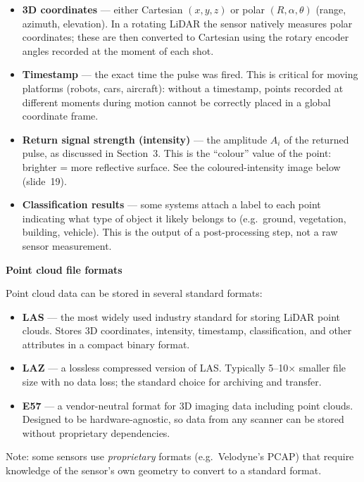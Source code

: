 \documentclass[12pt, a4paper]{article}
\begin{document}
\begin{itemize}[leftmargin=1.4em,itemsep=3pt]
  \item \textbf{3D coordinates} --- either Cartesian $(x, y, z)$ or polar
    $(R, \alpha, \theta)$ (range, azimuth, elevation).
    In a rotating LiDAR the sensor natively measures polar coordinates;
    these are then converted to Cartesian using the rotary encoder angles
    recorded at the moment of each shot.

  \item \textbf{Timestamp} --- the exact time the pulse was fired.
    This is critical for moving platforms (robots, cars, aircraft): without
    a timestamp, points recorded at different moments during motion cannot
    be correctly placed in a global coordinate frame.

  \item \textbf{Return signal strength (intensity)} --- the amplitude $A_i$
    of the returned pulse, as discussed in Section~3.
    This is the ``colour'' value of the point: brighter = more reflective
    surface.
    See the coloured-intensity image below (slide~19).

  \item \textbf{Classification results} --- some systems attach a label to
    each point indicating what type of object it likely belongs to
    (e.g.\ ground, vegetation, building, vehicle).
    This is the output of a post-processing step, not a raw sensor
    measurement.
\end{itemize}
\begin{notebox}
  \textbf{Point cloud file formats}

  Point cloud data can be stored in several standard formats:
  \begin{itemize}[leftmargin=1.2em,itemsep=2pt]
    \item \textbf{LAS} --- the most widely used industry standard for storing
      LiDAR point clouds.  Stores 3D coordinates, intensity, timestamp,
      classification, and other attributes in a compact binary format.
    \item \textbf{LAZ} --- a lossless compressed version of LAS.  Typically
      5--10$\times$ smaller file size with no data loss; the standard choice
      for archiving and transfer.
    \item \textbf{E57} --- a vendor-neutral format for 3D imaging data
      including point clouds.  Designed to be hardware-agnostic, so data
      from any scanner can be stored without proprietary dependencies.
  \end{itemize}
  Note: some sensors use \emph{proprietary} formats (e.g.\ Velodyne's PCAP)
  that require knowledge of the sensor's own geometry to convert to a
  standard format.
\end{notebox}
\end{document}
